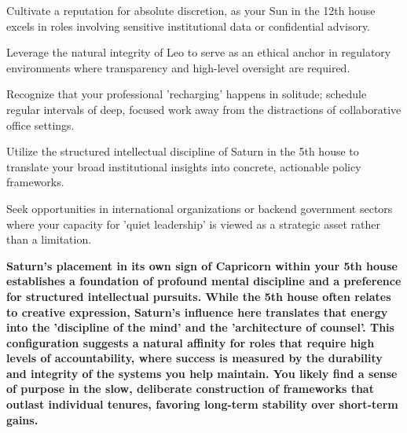 \begin{diamondlist}
  \item {\fontsize{8.5}{12}\selectfont Cultivate a reputation for absolute discretion, as your Sun in the 12th house excels in roles involving sensitive institutional data or confidential advisory.}
  \item {\fontsize{8.5}{12}\selectfont Leverage the natural integrity of Leo to serve as an ethical anchor in regulatory environments where transparency and high-level oversight are required.}
  \item {\fontsize{8.5}{12}\selectfont Recognize that your professional 'recharging' happens in solitude; schedule regular intervals of deep, focused work away from the distractions of collaborative office settings.}
  \item {\fontsize{8.5}{12}\selectfont Utilize the structured intellectual discipline of Saturn in the 5th house to translate your broad institutional insights into concrete, actionable policy frameworks.}
  \item {\fontsize{8.5}{12}\selectfont Seek opportunities in international organizations or backend government sectors where your capacity for 'quiet leadership' is viewed as a strategic asset rather than a limitation.}
\end{diamondlist}


\label{topic44}

{\fontsize{9.5}{13.8}\selectfont\bfseries\color{DeepSlate} Saturn's placement in its own sign of Capricorn within your 5th house establishes a foundation of profound mental discipline and a preference for structured intellectual pursuits. While the 5th house often relates to creative expression, Saturn's influence here translates that energy into the 'discipline of the mind' and the 'architecture of counsel'. This configuration suggests a natural affinity for roles that require high levels of accountability, where success is measured by the durability and integrity of the systems you help maintain. You likely find a sense of purpose in the slow, deliberate construction of frameworks that outlast individual tenures, favoring long-term stability over short-term gains.}\par\vspace{2mm}

